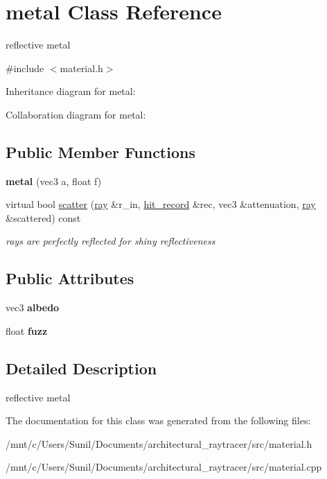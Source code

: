 \hypertarget{classmetal}{}\section{metal Class Reference}
\label{classmetal}


reflective metal  




{\ttfamily \#include $<$material.\+h$>$}



Inheritance diagram for metal\+:


Collaboration diagram for metal\+:
\subsection*{Public Member Functions}
\begin{DoxyCompactItemize}
\item 
\mbox{\label{classmetal_af79883340e12b0c5db5afe23f5383942}} 
{\bfseries metal} (vec3 a, float f)
\item 
\mbox{\label{classmetal_a10a5e6a8335687f98b58ea59cac5b694}} 
virtual bool \hyperlink{classmetal_a10a5e6a8335687f98b58ea59cac5b694}{scatter} (\hyperlink{classray}{ray} \&r\+\_\+in, \hyperlink{structhit__record}{hit\+\_\+record} \&rec, vec3 \&attenuation, \hyperlink{classray}{ray} \&scattered) const
\begin{DoxyCompactList}\small\item\em rays are perfectly reflected for shiny reflectiveness \end{DoxyCompactList}\end{DoxyCompactItemize}
\subsection*{Public Attributes}
\begin{DoxyCompactItemize}
\item 
\mbox{\label{classmetal_a7c16624a6f180f58c3bda5558c71e7c1}} 
vec3 {\bfseries albedo}
\item 
\mbox{\label{classmetal_a7b1a155f70bf086fc84c4c17d1e6f88c}} 
float {\bfseries fuzz}
\end{DoxyCompactItemize}


\subsection{Detailed Description}
reflective metal 

The documentation for this class was generated from the following files\+:\begin{DoxyCompactItemize}
\item 
/mnt/c/\+Users/\+Sunil/\+Documents/architectural\+\_\+raytracer/src/material.\+h\item 
/mnt/c/\+Users/\+Sunil/\+Documents/architectural\+\_\+raytracer/src/material.\+cpp\end{DoxyCompactItemize}
